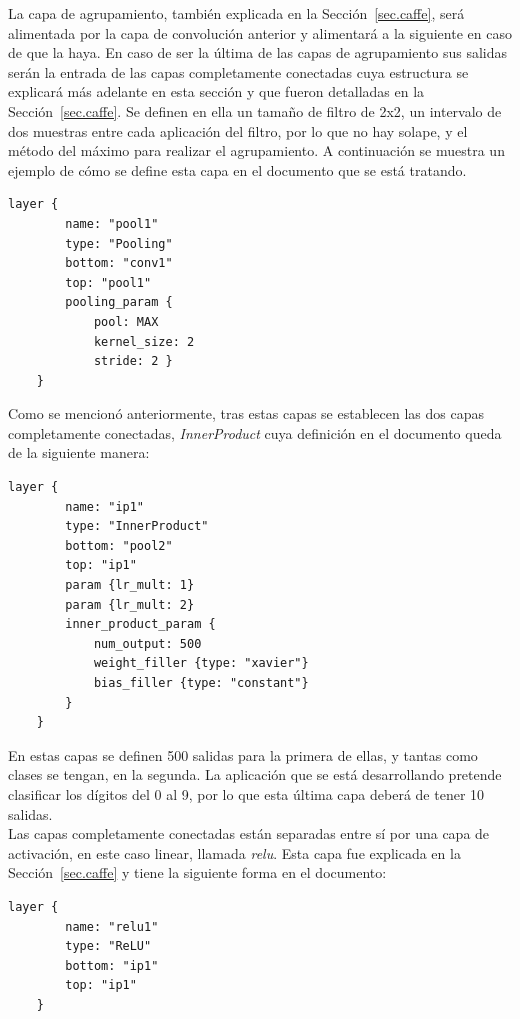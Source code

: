 	La capa de agrupamiento, también explicada en la Sección~\ref{sec.caffe}, será alimentada por la capa de convolución anterior y alimentará a la siguiente en caso de que la haya. En caso de ser la última de las capas de agrupamiento sus salidas serán la entrada de las capas completamente conectadas cuya estructura se explicará más adelante en esta sección y que fueron detalladas en la Sección~\ref{sec.caffe}. Se definen en ella un tamaño de filtro de 2x2, un intervalo de dos muestras entre cada aplicación del filtro, por lo que no hay solape, y el método del máximo para realizar el agrupamiento. A continuación se muestra un ejemplo de cómo se define esta capa en el documento que se está tratando.
	\vspace{10pt}
	\begin{lstlisting}[frame=single]
	layer {
		name: "pool1"
		type: "Pooling"
		bottom: "conv1"
		top: "pool1"
		pooling_param {
			pool: MAX
			kernel_size: 2
			stride: 2 }
	}	
	\end{lstlisting}

	Como se mencionó anteriormente, tras estas capas se establecen las dos capas completamente conectadas, \textit{InnerProduct} cuya definición en el documento queda de la siguiente manera: 
	\vspace{10pt}
	\begin{lstlisting}[frame=single]
	layer {
		name: "ip1"
		type: "InnerProduct"
		bottom: "pool2"
		top: "ip1"
		param {lr_mult: 1}
		param {lr_mult: 2}
		inner_product_param {
			num_output: 500
			weight_filler {type: "xavier"}
			bias_filler {type: "constant"}
		}
	}	
	\end{lstlisting}
	
	En estas capas se definen 500 salidas para la primera de ellas, y tantas como clases se tengan, en la segunda. La aplicación que se está desarrollando pretende clasificar los dígitos del 0 al 9, por lo que esta última capa deberá de tener 10 salidas.\\

	Las capas completamente conectadas están separadas entre sí por una capa de activación, en este caso linear, llamada \textit{\acrshort{relu}}. Esta capa fue explicada en la Sección~\ref{sec.caffe} y tiene la siguiente forma en el documento:
	\vspace{10pt}
	\begin{lstlisting}[frame=single]
	layer {
		name: "relu1"
		type: "ReLU"
		bottom: "ip1"
		top: "ip1"
	}	
	\end{lstlisting}
	

